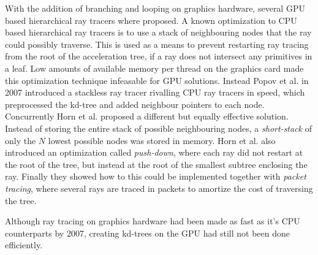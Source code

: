 With the addition of branching and looping on graphics hardware,
several GPU based hierarchical ray tracers where proposed. A known
optimization to CPU based hierarchical ray tracers is to use a stack
of neighbouring nodes that the ray could possibly traverse. This is
used as a means to prevent restarting ray tracing from the root of the
acceleration tree, if a ray does not intersect any primitives in a
leaf. Low amounts of available memory per thread on the graphics card
made this optimization technique infeasable for GPU solutions. Instead
Popov et al. in 2007 introduced a stackless
ray tracer rivalling CPU ray tracers in speed, which preprocessed the
kd-tree and added neighbour pointers to each node. Concurrently Horn
et al. proposed a different but equally effective
solution. Instead of storing the entire stack of possible neighbouring
nodes, a \textit{short-stack} of only the $N$ lowest possible nodes
was stored in memory. Horn et al. also introduced an optimization
called \textit{push-down}, where each ray did not restart at the root
of the tree, but instead at the root of the smallest subtree enclosing
the ray. Finally they showed how to this could be implemented together
with \textit{packet tracing}, where several rays are traced in packets
to amortize the cost of traversing the tree.





Although ray tracing on graphics hardware had been made as fast as
it's CPU counterparts by 2007, creating kd-trees on the GPU had still
not been done efficiently.

